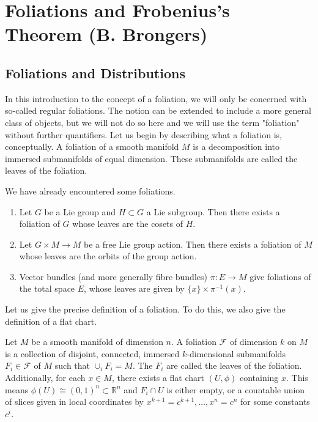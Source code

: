 \chapter{Foliations and Frobenius's Theorem (B. Brongers)}

\section{Foliations and Distributions}

In this introduction to the concept of a foliation, we will only be concerned with so-called regular foliations. The notion can be extended to include a more general class of objects, but we will not do so here and we will use the term "foliation" without further quantifiers. Let us begin by describing what a foliation is, conceptually. A foliation of a smooth manifold $M$ is a decomposition into immersed submanifolds of equal dimension. These submanifolds are called the leaves of the foliation. 
\begin{example}
  We have already encountered some foliations.
  \begin{enumerate}
    \item Let $G$ be a Lie group and $H\subset G$ a Lie subgroup. Then there exists a foliation of $G$ whose leaves are the cosets of $H$.
    \item Let $G\times M\to M$ be a free Lie group action. Then there exists a foliation of $M$ whose leaves are the orbits of the group action.
    \item Vector bundles (and more generally fibre bundles) $\pi:E\to M$ give foliations of the total space $E$, whose leaves are given by $\{x\}\times \pi^{-1}(x)$.
  \end{enumerate}
\end{example}
Let us give the precise definition of a foliation. To do this, we also give the definition of a flat chart.
\begin{definition}
  Let $M$ be a smooth manifold of dimension $n$. A foliation $\mathcal{F}$ of dimension $k$ on $M$ is a collection of disjoint, connected, immersed $k$-dimensional submanifolds $F_i\in\mathcal{F}$ of $M$ such that $\cup_iF_i=M$. The $F_i$ are called the leaves of the foliation. Additionally, for each $x\in M$, there exists a flat chart $(U,\phi)$ containing $x$. This means $\phi(U)\cong (0,1)^n\subset\mathbb{R}^n$ and $F_i\cap U$ is either empty, or a countable union of slices given in local coordinates by $x^{k+1}=c^{k+1},\dots,x^n=c^n$ for some constants $c^i$.
\end{definition}
